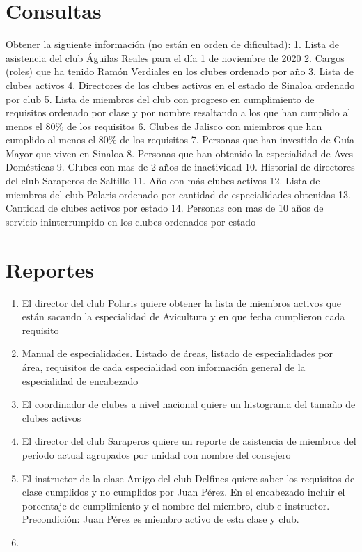 \documentclass[
  letterpaper,
  DIV=11,
  numbers=noendperiod]{scrreprt}
\providecommand{\tightlist}{%
  \setlength{\itemsep}{0pt}\setlength{\parskip}{0pt}}\usepackage{longtable,booktabs,array}
\begin{document}
\section{Consultas}\label{consultas}

Obtener la siguiente información (no están en orden de dificultad): 1.
Lista de asistencia del club Águilas Reales para el día 1 de noviembre
de 2020 2. Cargos (roles) que ha tenido Ramón Verdiales en los clubes
ordenado por año 3. Lista de clubes activos 4. Directores de los clubes
activos en el estado de Sinaloa ordenado por club 5. Lista de miembros
del club con progreso en cumplimiento de requisitos ordenado por clase y
por nombre resaltando a los que han cumplido al menos el 80\% de los
requisitos 6. Clubes de Jalisco con miembros que han cumplido al menos
el 80\% de los requisitos 7. Personas que han investido de Guía Mayor
que viven en Sinaloa 8. Personas que han obtenido la especialidad de
Aves Domésticas 9. Clubes con mas de 2 años de inactividad 10. Historial
de directores del club Saraperos de Saltillo 11. Año con más clubes
activos 12. Lista de miembros del club Polaris ordenado por cantidad de
especialidades obtenidas 13. Cantidad de clubes activos por estado 14.
Personas con mas de 10 años de servicio ininterrumpido en los clubes
ordenados por estado

\section{Reportes}\label{reportes-1}

\begin{enumerate}
\def\labelenumi{\arabic{enumi}.}
\tightlist
\item
  El director del club Polaris quiere obtener la lista de miembros
  activos que están sacando la especialidad de Avicultura y en que fecha
  cumplieron cada requisito
\item
  Manual de especialidades. Listado de áreas, listado de especialidades
  por área, requisitos de cada especialidad con información general de
  la especialidad de encabezado
\item
  El coordinador de clubes a nivel nacional quiere un histograma del
  tamaño de clubes activos
\item
  El director del club Saraperos quiere un reporte de asistencia de
  miembros del periodo actual agrupados por unidad con nombre del
  consejero
\item
  El instructor de la clase Amigo del club Delfines quiere saber los
  requisitos de clase cumplidos y no cumplidos por Juan Pérez. En el
  encabezado incluir el porcentaje de cumplimiento y el nombre del
  miembro, club e instructor. Precondición: Juan Pérez es miembro activo
  de esta clase y club.
\item
\end{enumerate}
\end{document}
